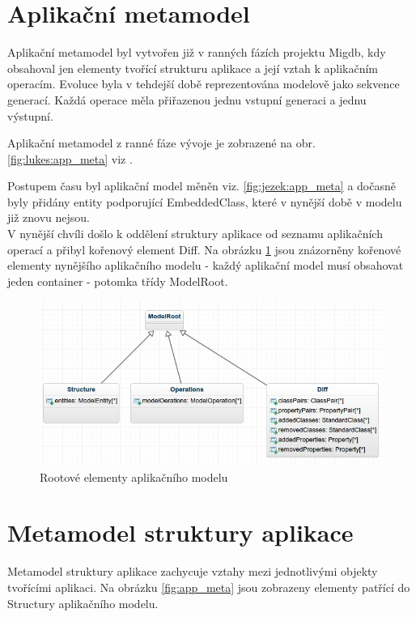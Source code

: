 \documentclass[11pt,twoside,a4paper]{book}
\begin{document}
\section{Aplikační metamodel}
Aplikační metamodel byl vytvořen již v ranných fázích projektu Migdb, kdy
obsahoval jen elementy tvořící strukturu aplikace a její vztah k
aplikačním operacím. Evoluce byla v tehdejší době reprezentována
modelově jako sekvence generací. Každá operace měla přiřazenou jednu vstupní
generaci a jednu výstupní.

Aplikační metamodel z ranné fáze vývoje je zobrazené na obr.
\ref{fig:lukes:app_meta} viz \cite{Lukes}.


Postupem času byl aplikační model měněn viz. \ref{fig:jezek:app_meta}
\cite{Jezek} a dočasně byly přidány entity podporující EmbeddedClass, které v
nynější době v modelu již znovu nejsou.\\

V nynější chvíli došlo k oddělení struktury aplikace od seznamu
aplikačních operací a přibyl kořenový element Diff. Na obrázku
\ref{fig:app_roots} jsou znázorněny kořenové elementy nynějšího aplikačního
modelu - každý aplikační model musí obsahovat jeden container - potomka třídy ModelRoot.

\begin{figure}[h]
\begin{center}
\includegraphics[width=15cm]{figures/app_roots}
\caption{Rootové elementy aplikačního modelu}
\label{fig:app_roots}
\end{center}
\end{figure}
\FloatBarrier

\section{Metamodel struktury aplikace}

Metamodel struktury aplikace zachycuje vztahy mezi jednotlivými objekty
tvořícími aplikaci. Na obrázku \ref{fig:app_meta} jsou
zobrazeny elementy patřící do Structury aplikačního modelu.
\end{document}
